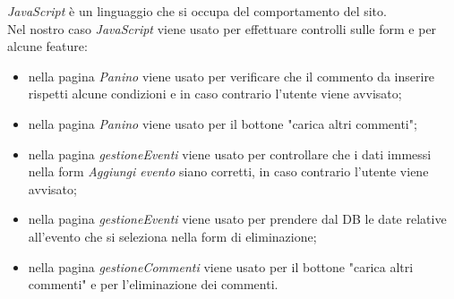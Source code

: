 \emph{JavaScript} è un linguaggio che si occupa del comportamento del sito.\\
Nel nostro caso \emph{JavaScript} viene usato per effettuare controlli sulle form e per alcune feature:
\begin{itemize}
    \item nella pagina \emph{Panino} viene usato per verificare che il commento da inserire rispetti alcune condizioni e in caso contrario l'utente viene avvisato;
    \item nella pagina \emph{Panino} viene usato per il bottone "carica altri commenti";
    \item nella pagina \emph{gestioneEventi} viene usato per controllare che i dati immessi nella form \emph{Aggiungi evento} siano corretti, in caso contrario l'utente viene avvisato;
    \item nella pagina \emph{gestioneEventi} viene usato per prendere dal DB le date relative all'evento che si seleziona nella form di eliminazione;
    \item nella pagina \emph{gestioneCommenti} viene usato per il bottone "carica altri commenti" e per l'eliminazione dei commenti.
\end{itemize}